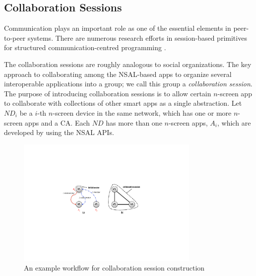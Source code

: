 \documentclass[conference]{IEEEtran}
\begin{document}
\subsection{Collaboration Sessions}
Communication plays an important role as one of the essential elements in peer-to-peer systems. There are numerous research efforts in session-based primitives for structured communication-centred programming  \cite{Honda:2008, Yoshida:2007}.

The collaboration sessions are roughly analogous to social organizations.
The key approach to collaborating among the NSAL-based apps to organize several interoperable applications into a group; we call this group a \textit{collaboration session}.
The purpose of introducing collaboration sessions is to allow certain $n$-screen app to collaborate with collections of other smart apps as a single abstraction. Let $ND_i$ be a $i$-th $n$-screen device in the same network,  which has one or more $n$-screen apps and a CA.
Each $ND$ has more than one $n$-screen apps, $A_i$, which are developed by using the NSAL APIs.
    \begin{figure}[htb] %
    \centering
    \includegraphics[width=8.8cm,keepaspectratio]{consession}
    \caption{An example workflow for collaboration session construction}
    \label{fig:constructsession}
    \end{figure}
\end{document}
